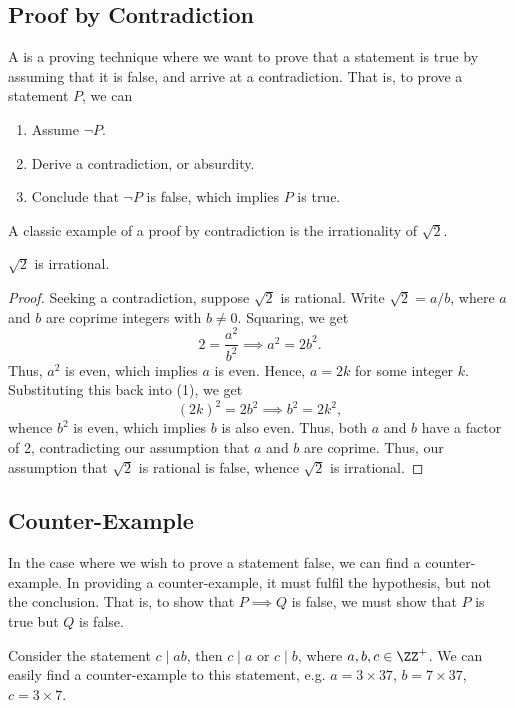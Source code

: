 \subsection{Proof by Contradiction}

A  is a proving technique where we want to prove that a statement is true by assuming that it is false, and arrive at a contradiction. That is, to prove a statement $P$, we can 
\renewcommand{\theenumi}{\arabic{enumi}.}
\begin{enumerate}
    \item Assume $\lnot P$.
    \item Derive a contradiction, or absurdity.
    \item Conclude that $\lnot P$ is false, which implies $P$ is true.
\end{enumerate}
\renewcommand{\theenumi}{(\alph{enumi})}

A classic example of a proof by contradiction is the irrationality of $\sqrt 2$.

\begin{statement}
    $\sqrt2$ is irrational.
\end{statement}
\begin{proof}
    Seeking a contradiction, suppose $\sqrt2$ is rational. Write $\sqrt2 = a/b$, where $a$ and $b$ are coprime integers with $b \neq 0$. Squaring, we get \[2 = \frac{a^2}{b^2} \implies a^2 = 2b^2. \tag{1}\] Thus, $a^2$ is even, which implies $a$ is even. Hence, $a = 2k$ for some integer $k$. Substituting this back into (1), we get \[(2k)^2 = 2b^2 \implies b^2 = 2k^2,\] whence $b^2$ is even, which implies $b$ is also even. Thus, both $a$ and $b$ have a factor of 2, contradicting our assumption that $a$ and $b$ are coprime. Thus, our assumption that $\sqrt2$ is rational is false, whence $\sqrt2$ is irrational.
\end{proof}

\subsection{Counter-Example}

In the case where we wish to prove a statement false, we can find a counter-example. In providing a counter-example, it must fulfil the hypothesis, but not the conclusion. That is, to show that $P \implies Q$ is false, we must show that $P$ is true but $Q$ is false.

\begin{example}
    Consider the statement $c \mid ab$, then $c \mid a$ or $c \mid b$, where $a, b, c \in \ZZ^+$. We can easily find a counter-example to this statement, e.g. $a = 3 \times 37$, $b = 7 \times 37$, $c = 3 \times 7$.
\end{example}